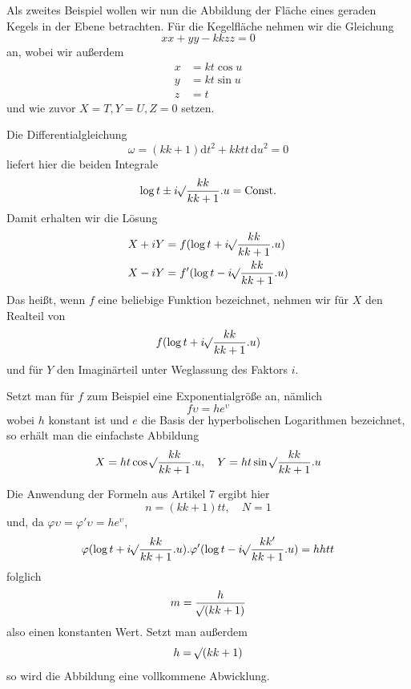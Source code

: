 Als zweites Beispiel wollen wir nun die Abbildung der Fläche eines geraden Kegels in der Ebene betrachten. Für die Kegelfläche nehmen wir die Gleichung
\[
xx+yy-kkzz=0
\]
\noindent an, wobei wir außerdem
\[
\begin{aligned}
x&=kt\cos u\\
y&=kt\sin u\\
z&=t
\end{aligned}
\]
\noindent und wie zuvor \(X=T,Y=U,Z=0\) setzen.

Die Differentialgleichung
\[
\omega=(kk+1)\mathrm{d}t^2+kktt\,\mathrm{d}u^2=0
\]
\noindent liefert hier die beiden Integrale
\[
\log t\pm i\mathord{{}^{}\!\surd}\frac{kk}{kk+1}\mathord{.}u=\text{Const.}
\]
\noindent Damit erhalten wir die Lösung
\[
\begin{aligned}
X+iY&=f(\log t+i\mathord{{}^{}\!\surd}\frac{kk}{kk+1}\mathord{.}u)\\
X-iY&=f'(\log t-i\mathord{{}^{}\!\surd}\frac{kk}{kk+1}\mathord{.}u)
\end{aligned}
\]
\noindent Das heißt, wenn \(f\) eine beliebige Funktion bezeichnet, nehmen wir für \(X\) den Realteil von
\[
f(\log t+i\mathord{{}^{}\!\surd}\frac{kk}{kk+1}\mathord{.}u)
\]
\noindent und für \(Y\) den Imaginärteil unter Weglassung des Faktors \(i\).
\par\indent{}%
Setzt man für \(f\) zum Beispiel eine Exponentialgröße an, nämlich
\[
f\upsilon=he^{\upsilon}
\]
\noindent wobei \(h\) konstant ist und \(e\) die Basis der hyperbolischen Logarithmen bezeichnet, so erhält man die einfachste Abbildung
\[
X=ht\cos\mathord{{}^{}\!\surd}\frac{kk}{kk+1}\mathord{.}u,\quad
Y=ht\sin\mathord{{}^{}\!\surd}\frac{kk}{kk+1}\mathord{.}u
\]

Die Anwendung der Formeln aus Artikel 7 ergibt hier
\[
n=(kk+1)tt,\quad N=1
\]
\noindent und, da \(\varphi\upsilon=\varphi'\upsilon=he^{\upsilon}\),
\[
\varphi(\log t+i\mathord{{}^{}\!\surd}\frac{kk}{kk+1}\mathord{.}u)\mathord{.}\varphi'(\log t-i\mathord{{}^{}\!\surd}\frac{kk'}{kk+1}\mathord{.}u)=hhtt
\]
\noindent folglich
\[
m=\frac{h}{\mathord{{}^{}\!\surd}(kk+1)}
\]
\noindent also einen konstanten Wert. Setzt man außerdem
\[
h=\mathord{{}^{}\!\surd}(kk+1)
\]
\noindent so wird die Abbildung eine vollkommene Abwicklung.

